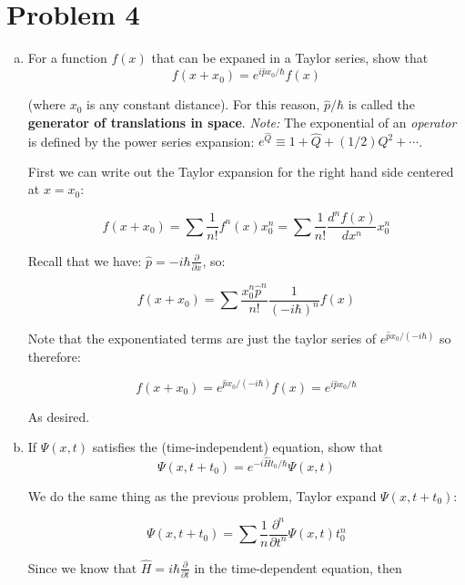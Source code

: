 \documentclass[10pt]{article}
\begin{document}
    \pagebreak

    \section*{Problem 4}

    \begin{enumerate}[(a)]
        \item For a function $f(x)$ that can be expaned in a Taylor series, show that 
        \[ f(x + x_0) = e^{i \hat p x_0/\hbar}f(x) \]

        (where $x_0$ is any constant distance). For this reason, $\hat p/\hbar$ is called the \textbf{generator of translations in space}. \textit{Note:} The exponential of an \textit{operator} is defined by the power series expansion: $e^{\hat Q} \equiv 1 + \hat Q + (1/2)Q^2 + \cdots$. 

        \begin{solution}
            First we can write out the Taylor expansion for the right hand side centered at $x = x_0$: 

            \[ f(x + x_0) = \sum \frac{1}{n!} f^n(x) x_0^n = \sum \frac{1}{n!} \frac{d^nf(x)}{dx^n} x_0^n\]

            Recall that we have: $\hat p = - i\hbar \frac{\partial}{\partial x}$, so:


            \[ f(x + x_0) = \sum \frac{x_0^n\hat p^n}{n!}\frac{1}{(-i\hbar)^n} f(x)\]

            Note that the exponentiated terms are just the taylor series of $e^{\hat p x_0/(-i\hbar)}$ so therefore: 

            \[ f(x + x_0) = e^{\hat p x_0/(-i\hbar)} f(x) = e^{i \hat p x_0/\hbar}\] 

            As desired.  
        \end{solution}
        \item If $\Psi(x, t)$ satisfies the (time-independent) \schrodinger equation, show that 
        \[ \Psi(x, t + t_0) = e^{-i\hat H t_0/\hbar}\Psi(x, t)\]

        \begin{solution}
            We do the same thing as the previous problem, Taylor expand $\Psi(x, t + t_0)$: 

            \[\Psi(x, t + t_0) = \sum \frac{1}{n} \frac{\partial^n}{\partial t^n} \Psi(x, t) t_0^n\]

            Since we know that $\hat H = i\hbar \frac{\partial}{\partial t}$ in the time-dependent \schrodinger equation, then 


\end{solution}
\end{enumerate}
\end{document}

